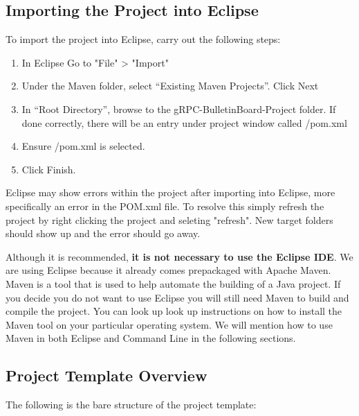 \documentclass{article}
\begin{document}
\subsection{Importing the Project into Eclipse}
To import the project into Eclipse, carry out the following steps:
\begin{enumerate}
\item In Eclipse Go to "File" > "Import"
\item Under the Maven folder, select “Existing Maven Projects”. Click Next
\item In “Root Directory”, browse to the gRPC-BulletinBoard-Project folder. If done correctly, there will be an entry under project window called /pom.xml
\item Ensure /pom.xml is selected. 
\item Click Finish.
\end{enumerate}
\begin{info}[Note:]
Eclipse may show errors within the project after importing into Eclipse, more specifically an error in the POM.xml file. To resolve this simply refresh the project by right clicking the project and seleting "refresh". New target folders should show up and the error should go away. 
\end{info}
\begin{info}
Although it is recommended, \textbf{it is not necessary to use the Eclipse IDE}. We are using Eclipse because it already comes prepackaged with Apache Maven. Maven is a tool that is used to help automate the building of a Java project. If you decide you do not want to use Eclipse you will still need Maven to build and compile the project. You can look up look up instructions on how to install the Maven tool on your particular operating system. We will mention how to use Maven in both Eclipse and Command Line in the following sections.
\end{info}

\subsection{Project Template Overview}

The following is the bare structure of the project template: \\

\end{document}
